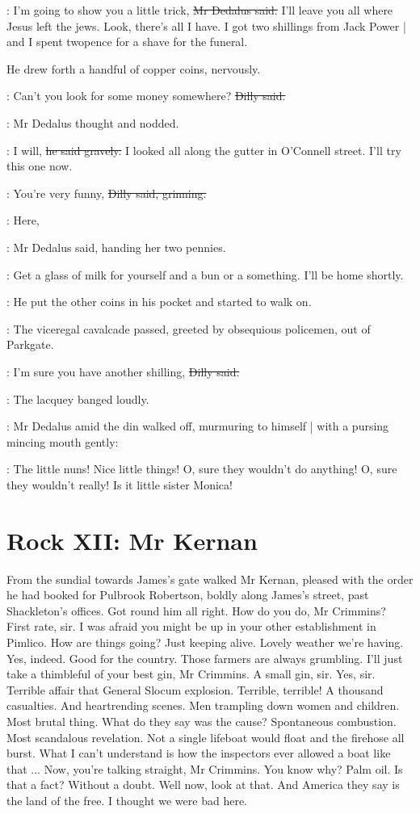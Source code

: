 \simon:
I'm going to show you a little trick,
\sout{Mr Dedalus said.}
I'll leave you all where Jesus left the jews.
Look, there's all I have.
I got two shillings from Jack Power |
and I spent twopence for a shave for the funeral.

He drew forth a handful of copper coins,
nervously.

\dilly:
Can't you look for some money somewhere?
\sout{Dilly said.}

:
Mr Dedalus thought and nodded.

\simon:
I will,
\sout{he said gravely.}
I looked all along the gutter in O'Connell street.
I'll try this one now.

\dilly:
You're very funny,
\sout{Dilly said, grinning.}

\simon:
Here,

:
Mr Dedalus said,
handing her two pennies.

\simon:
Get a glass of milk for yourself
and a bun or a something.
I'll be home shortly.

:
He put the other coins in his pocket and started to walk on.

:
The viceregal cavalcade passed,
greeted by obsequious policemen,
out of Parkgate.%

\dilly:
I'm sure you have another shilling,
\sout{Dilly said.}

:
The lacquey banged loudly.

:
Mr Dedalus amid the din walked off,
murmuring to himself |
with a pursing mincing mouth gently:

\simon:
The little nuns!
Nice little things!
O, sure they wouldn't do anything!
O, sure they wouldn't really!
Is it little sister Monica!


\section*{Rock XII: Mr Kernan}


From the sundial
towards James's gate
walked Mr Kernan,
pleased with the order he had booked for Pulbrook Robertson,
boldly along James's street,
past Shackleton's offices.
Got round him all right.
How do you do, Mr Crimmins?
First rate, sir.
I was afraid you might be up in your other establishment in Pimlico.
How are things going?
Just keeping alive.
Lovely weather we're having.
Yes, indeed.
Good for the country.
Those farmers are always grumbling.
I'll just take a thimbleful of your best gin, Mr Crimmins.
A small gin, sir.
Yes, sir.
Terrible affair that
General Slocum explosion.
Terrible, terrible!
A thousand casualties.
And heartrending scenes.
Men trampling down women and children.
Most brutal thing.
What do they say was the cause?
Spontaneous combustion.
Most scandalous revelation.
Not a single lifeboat would float and the firehose all burst.
What I can't understand
is how the inspectors ever allowed a boat like that ...
Now, you're talking straight, Mr Crimmins.
You know why?
Palm oil.
Is that a fact?
Without a doubt.
Well now, look at that.
And America they say is the land of the free.
I thought we were bad here.

